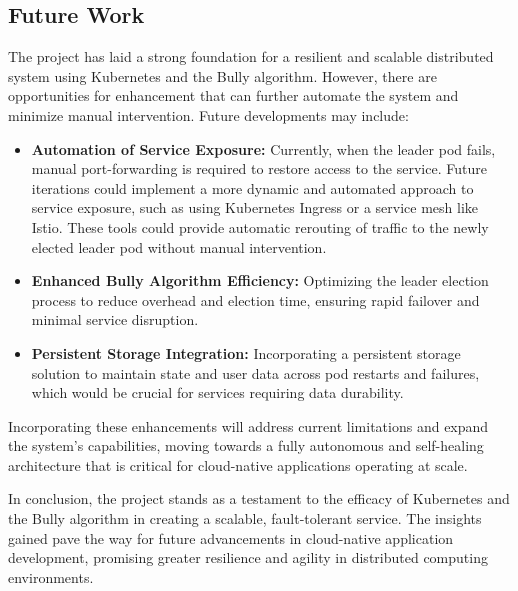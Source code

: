 \documentclass{article}
\begin{document}
  \subsection{Future Work}
  The project has laid a strong foundation for a resilient and scalable distributed system using Kubernetes and the Bully algorithm. However, there are opportunities for enhancement that can further automate the system and minimize manual intervention. Future developments may include:

\begin{itemize}
  \item \textbf{Automation of Service Exposure:} Currently, when the leader pod fails, manual port-forwarding is required to restore access to the service. Future iterations could implement a more dynamic and automated approach to service exposure, such as using Kubernetes Ingress or a service mesh like Istio. These tools could provide automatic rerouting of traffic to the newly elected leader pod without manual intervention.
  \item \textbf{Enhanced Bully Algorithm Efficiency:} Optimizing the leader election process to reduce overhead and election time, ensuring rapid failover and minimal service disruption.
  \item \textbf{Persistent Storage Integration:} Incorporating a persistent storage solution to maintain state and user data across pod restarts and failures, which would be crucial for services requiring data durability.
\end{itemize}

Incorporating these enhancements will address current limitations and expand the system's capabilities, moving towards a fully autonomous and self-healing architecture that is critical for cloud-native applications operating at scale.
\vspace*{0.2cm}

  In conclusion, the project stands as a testament to the efficacy of Kubernetes and the Bully algorithm in creating a scalable, fault-tolerant service. The insights gained pave the way for future advancements in cloud-native application development, promising greater resilience and agility in distributed computing environments.

    \nocite{*}
\end{document}
